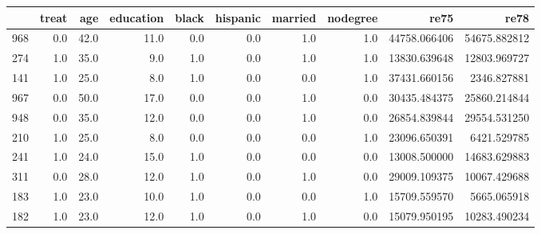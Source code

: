 \begin{tabular}{lrrrrrrrrr}
\toprule
{} &  treat &   age &  education &  black &  hispanic &  married &  nodegree &          re75 &          re78 \\
\midrule
968 &    0.0 &  42.0 &       11.0 &    0.0 &       0.0 &      1.0 &       1.0 &  44758.066406 &  54675.882812 \\
274 &    1.0 &  35.0 &        9.0 &    1.0 &       0.0 &      1.0 &       1.0 &  13830.639648 &  12803.969727 \\
141 &    1.0 &  25.0 &        8.0 &    1.0 &       0.0 &      0.0 &       1.0 &  37431.660156 &   2346.827881 \\
967 &    0.0 &  50.0 &       17.0 &    0.0 &       0.0 &      1.0 &       0.0 &  30435.484375 &  25860.214844 \\
948 &    0.0 &  35.0 &       12.0 &    0.0 &       0.0 &      1.0 &       0.0 &  26854.839844 &  29554.531250 \\
210 &    1.0 &  25.0 &        8.0 &    0.0 &       0.0 &      0.0 &       1.0 &  23096.650391 &   6421.529785 \\
241 &    1.0 &  24.0 &       15.0 &    1.0 &       0.0 &      0.0 &       0.0 &  13008.500000 &  14683.629883 \\
311 &    0.0 &  28.0 &       12.0 &    1.0 &       0.0 &      1.0 &       0.0 &  29009.109375 &  10067.429688 \\
183 &    1.0 &  23.0 &       10.0 &    1.0 &       0.0 &      0.0 &       1.0 &  15709.559570 &   5665.065918 \\
182 &    1.0 &  23.0 &       12.0 &    1.0 &       0.0 &      1.0 &       0.0 &  15079.950195 &  10283.490234 \\
\bottomrule
\end{tabular}

